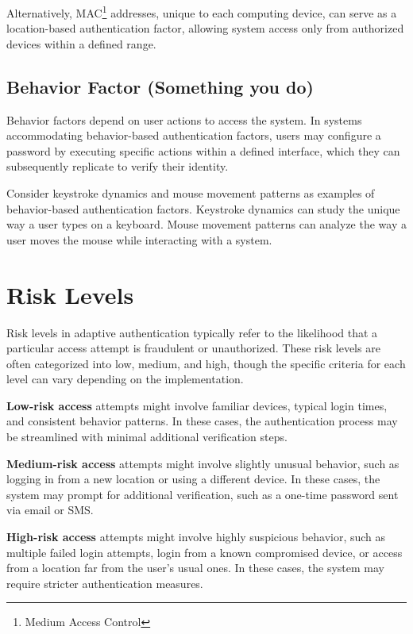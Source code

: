 Alternatively, MAC\footnote{Medium Access Control} addresses, unique to each computing device, can serve as a location-based authentication factor, allowing system access only from authorized devices within a defined range.

\newpage
\subsection{Behavior Factor (Something you do)}
Behavior factors depend on user actions to access the system. In systems accommodating behavior-based authentication factors, users may configure a password by executing specific actions within a defined interface, which they can subsequently replicate to verify their identity.

Consider keystroke dynamics and mouse movement patterns as examples of behavior-based authentication factors.
Keystroke dynamics can study the unique way a user types on a keyboard.
Mouse movement patterns can analyze the way a user moves the mouse while interacting with a system. \cite{auth-factors-aratek} \cite{auth-factors-sumologic} \cite{auth-factors-globalknowledge} 

\section{Risk Levels}
Risk levels in adaptive authentication typically refer to the likelihood that a particular access attempt is fraudulent or unauthorized.
These risk levels are often categorized into low, medium, and high, though the specific criteria for each level can vary depending on the implementation.

\textbf{Low-risk access} attempts might involve familiar devices, typical login times, and consistent behavior patterns. In these cases, the authentication process may be streamlined with minimal additional verification steps.

\textbf{Medium-risk access} attempts might involve slightly unusual behavior, such as logging in from a new location or using a different device.
In these cases, the system may prompt for additional verification, such as a one-time password sent via email or SMS.

\textbf{High-risk access} attempts might involve highly suspicious behavior, such as multiple failed login attempts, login from a known compromised device, or access from a location far from the user's usual ones.
In these cases, the system may require stricter authentication measures.

\shorthandon{-}